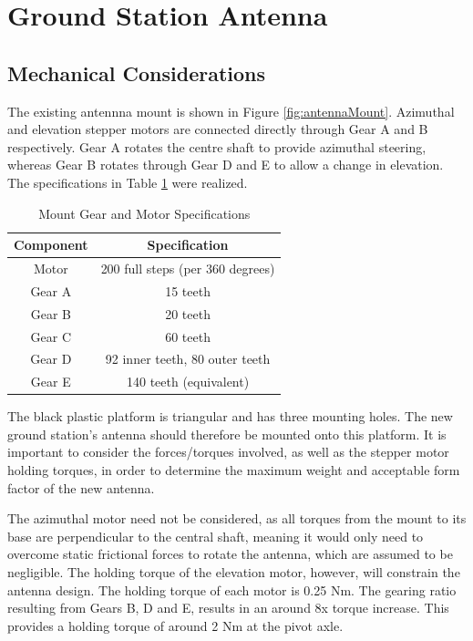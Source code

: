 \graphicspath{{./figures}}

\section{Ground Station Antenna}
\subsection{Mechanical Considerations}

The existing antennna mount is shown in Figure \ref{fig:antennaMount}. Azimuthal and elevation stepper motors are connected directly through Gear A and B respectively. Gear A rotates the centre shaft to provide azimuthal steering, whereas Gear B rotates through Gear D and E to allow a change in elevation. The 
specifications in Table \ref{tab:mount_specifications} were realized.

\begin{table}[!htb]
  \centering
  \renewcommand{\arraystretch}{1.2}
  \begin{tabular}{ |c|c| }
  \hline
  \textbf{Component}        & \textbf{Specification}    \\
  \hline
  Motor         & 200 full steps (per 360 degrees) \\ \hline
  Gear A        & 15 teeth \\ \hline
  Gear B        & 20 teeth \\ \hline
  Gear C        & 60 teeth \\ \hline
  Gear D        & 92 inner teeth, 80 outer teeth \\ \hline
  Gear E        & 140 teeth (equivalent) \\ \hline
  \end{tabular}
  \caption{Mount Gear and Motor Specifications}
  \label{tab:mount_specifications}
\end{table}

The black plastic platform is triangular and has three mounting holes. The new ground station's antenna should therefore be mounted onto this platform. It is important to consider the forces/torques involved, as well as the stepper motor holding torques, in order to determine the maximum weight and acceptable form factor of the new antenna.

The azimuthal motor need not be considered, as all torques from the mount to its base are perpendicular to the central shaft, meaning it would only need to overcome static frictional forces to rotate the antenna, which are assumed to be negligible. The holding torque of the elevation motor, however, will constrain the antenna design. The holding torque of each motor is 0.25 Nm. The gearing ratio resulting from Gears B, D and E, results in an around 8x torque increase. This provides a holding torque of around 2 Nm at the pivot axle.

